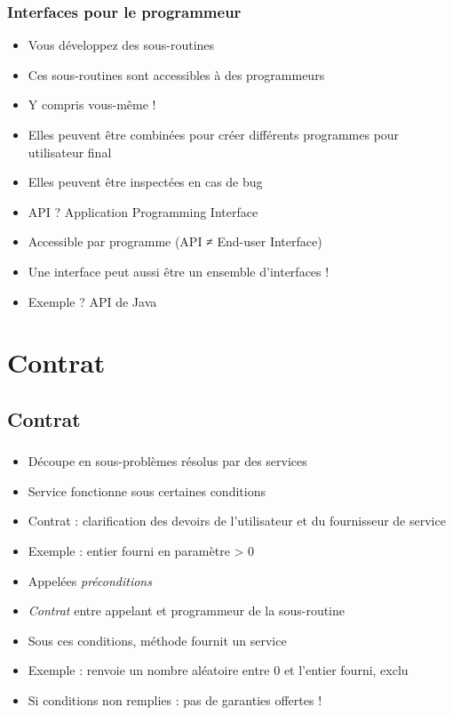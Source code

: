 \documentclass[english, french]{beamer}
\begin{document}
\begin{frame}
	\frametitle{Interfaces pour le programmeur}
	\begin{itemize}
		\item Vous développez des sous-routines
		\item Ces sous-routines sont accessibles à des programmeurs
		\item Y compris vous-même !
		\item Elles peuvent être combinées pour créer différents programmes pour utilisateur final
		\item Elles peuvent être inspectées en cas de bug
		\item API ? \pause Application Programming Interface
		\item Accessible par programme (API ≠ End-user Interface)
		\item Une interface peut aussi être un ensemble d’interfaces !
		\item Exemple ? \pause API de Java
	\end{itemize}
\end{frame}

\section{Contrat}
\subsection{Contrat}
\begin{frame}
	\frametitle{\subsecname}
	\begin{itemize}
		\item Découpe en sous-problèmes résolus par des services
		\item Service fonctionne sous certaines conditions
		\item Contrat : clarification des devoirs de l’utilisateur et du fournisseur de service
		\item Exemple : entier fourni en paramètre > 0
		\item Appelées \emph{préconditions}
		\item \emph{Contrat} entre appelant et programmeur de la sous-routine
		\item Sous ces conditions, méthode fournit un service
		\item Exemple : renvoie un nombre aléatoire entre 0 et l’entier fourni, exclu
		\item Si conditions non remplies : pas de garanties offertes !
	\end{itemize}
\end{frame}
\end{document}
